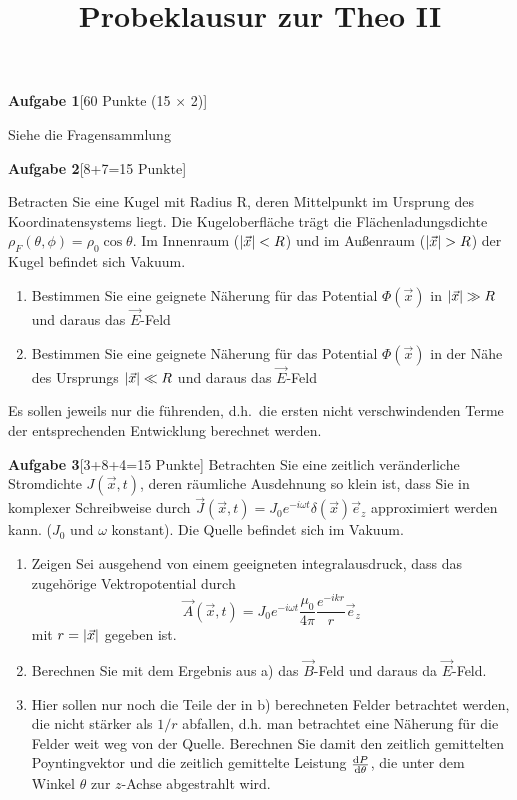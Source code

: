 
\title{Probeklausur zur Theo II}

\textbf{Aufgabe 1}\hfill[60 Punkte (15 $\times$ 2)]

Siehe die Fragensammlung

\textbf{Aufgabe 2}\hfill[8+7=15 Punkte]

Betracten Sie eine Kugel mit Radius R, deren Mittelpunkt im Ursprung des
Koordinatensystems liegt. Die Kugeloberfläche trägt die Flächenladungsdichte
$\rho_F(\theta,\phi)=\rho_0 \cos\theta$. Im Innenraum ($\abs{\vec x}<R$)
und im Außenraum ($\abs{\vec{x}}>R$) der Kugel befindet sich Vakuum.
\begin{enumerate}[label=\alph*)]
  \item Bestimmen Sie eine geignete Näherung für das Potential 
    $\Phi(\vec x)$ in $\abs{\vec x}\gg R$ und daraus
    das $\vec E$-Feld

  \item Bestimmen Sie eine geignete Näherung für das Potential 
    $\Phi(\vec x)$ in der Nähe des Ursprungs $\abs{\vec x}\ll R$ und daraus
    das $\vec E$-Feld
\end{enumerate}
Es sollen jeweils nur die führenden, d.h.\ die ersten nicht verschwindenden
Terme der entsprechenden Entwicklung berechnet werden.

\textbf{Aufgabe 3}\hfill[3+8+4=15 Punkte]
Betrachten Sie eine zeitlich veränderliche Stromdichte $J(\vec x,t)$, deren
räumliche Ausdehnung so klein ist, dass Sie in komplexer Schreibweise durch
$\vec J(\vec x,t)=J_0 e^{-i\omega t}\delta(\vec x)\vec e_z$ approximiert
werden kann. ($J_0$ und $\omega$ konstant). Die Quelle befindet sich 
im Vakuum.
\begin{enumerate}[label=\alph*)]
  \item Zeigen Sei ausgehend von einem geeigneten integralausdruck, dass
    das zugehörige Vektropotential durch
    \begin{equation*}
      \vec A(\vec x, t)
      =J_0 e^{-i\omega t}\frac{\mu_0}{4\pi}\frac{e^{-ikr}}{r}\vec e_z
    \end{equation*}
    mit $r=\abs{\vec x}$ gegeben ist.

  \item Berechnen Sie mit dem Ergebnis aus a) das $\vec B$-Feld und
    daraus da $\vec E$-Feld.

  \item Hier sollen nur noch die Teile der in b) berechneten Felder
    betrachtet werden, die nicht stärker als $1/r$ abfallen, d.h. man
    betrachtet eine Näherung für die Felder weit weg von der Quelle.
    Berechnen Sie damit den zeitlich gemittelten Poyntingvektor und
    die zeitlich gemittelte Leistung $\dv {P}{\theta}$, die unter dem
    Winkel $\theta$ zur $z$-Achse abgestrahlt wird.
\end{enumerate}


